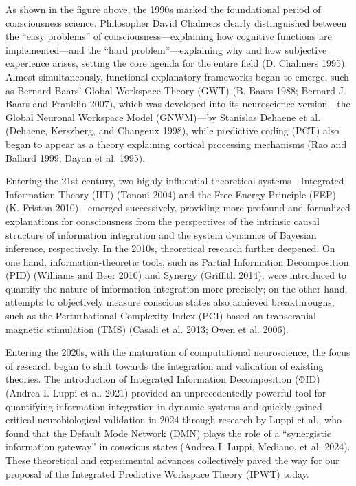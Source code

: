 \documentclass[
  a4paper]{article}
\begin{document}
As shown in the figure above, the 1990s marked the foundational period
of consciousness science. Philosopher David Chalmers clearly
distinguished between the ``easy problems'' of
consciousness---explaining how cognitive functions are implemented---and
the ``hard problem''---explaining why and how subjective experience
arises, setting the core agenda for the entire field (D. Chalmers 1995).
Almost simultaneously, functional explanatory frameworks began to
emerge, such as Bernard Baars' Global Workspace Theory (GWT) (B. Baars
1988; Bernard J. Baars and Franklin 2007), which was developed into its
neuroscience version---the Global Neuronal Workspace Model (GNWM)---by
Stanislas Dehaene et al. (Dehaene, Kerszberg, and Changeux 1998), while
predictive coding (PCT) also began to appear as a theory explaining
cortical processing mechanisms (Rao and Ballard 1999; Dayan et al.
1995).

Entering the 21st century, two highly influential theoretical
systems---Integrated Information Theory (IIT) (Tononi 2004) and the Free
Energy Principle (FEP) (K. Friston 2010)---emerged successively,
providing more profound and formalized explanations for consciousness
from the perspectives of the intrinsic causal structure of information
integration and the system dynamics of Bayesian inference, respectively.
In the 2010s, theoretical research further deepened. On one hand,
information-theoretic tools, such as Partial Information Decomposition
(PID) (Williams and Beer 2010) and Synergy (Griffith 2014), were
introduced to quantify the nature of information integration more
precisely; on the other hand, attempts to objectively measure conscious
states also achieved breakthroughs, such as the Perturbational
Complexity Index (PCI) based on transcranial magnetic stimulation (TMS)
(Casali et al. 2013; Owen et al. 2006).

Entering the 2020s, with the maturation of computational neuroscience,
the focus of research began to shift towards the integration and
validation of existing theories. The introduction of Integrated
Information Decomposition (ΦID) (Andrea I. Luppi et al. 2021) provided
an unprecedentedly powerful tool for quantifying information integration
in dynamic systems and quickly gained critical neurobiological
validation in 2024 through research by Luppi et al., who found that the
Default Mode Network (DMN) plays the role of a ``synergistic information
gateway'' in conscious states (Andrea I. Luppi, Mediano, et al. 2024).
These theoretical and experimental advances collectively paved the way
for our proposal of the Integrated Predictive Workspace Theory (IPWT)
today.
\end{document}
